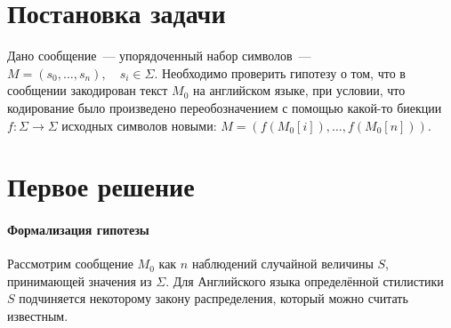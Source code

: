 \documentclass[a4paper,10pt]{article}
\begin{document}
%


\section{Постановка задачи}
Дано сообщение~--- упорядоченный набор символов~--- 
$M = (s_0, \ldots, s_n), \quad s_i \in \Sigma$.
Необходимо проверить гипотезу о том, что в сообщении закодирован текст $M_0$
на английском языке, при условии, что кодирование было произведено 
переобозначением с помощью какой-то биекции 
$f: \Sigma \rightarrow \Sigma$ 
исходных символов новыми: 
$M = (f(M_0[i]), \ldots, f(M_0[n]))$.

\section{Первое решение}
\paragraph{Формализация гипотезы}
Рассмотрим сообщение $M_0$ как $n$ наблюдений случайной величины $S$, 
принимающей значения из $\Sigma$.
Для Английского языка определённой стилистики $S$ подчиняется некоторому
закону распределения, который можно считать известным.







%
%
\end{document}
